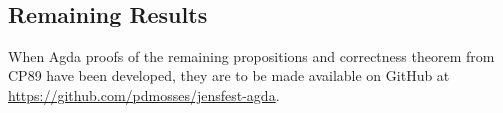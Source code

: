 {\begin{code}
\AgdaSymbol{(}\AgdaSpace{}%
\AgdaSymbol{(}\AgdaSpace{}%
\AgdaSymbol{)}\AgdaSpace{}%
\AgdaSymbol{))}\AgdaSpace{}%
\AgdaSymbol{(}\AgdaSpace{}%
\AgdaSymbol{(}\AgdaSpace{}%
\AgdaSymbol{)}\AgdaSpace{}%
\AgdaSpace{}%
\AgdaSymbol{)}\AgdaSpace{}%
\AgdaSymbol{(}\AgdaSpace{}%
\AgdaSymbol{(}\AgdaSpace{}%
\AgdaSymbol{(}\AgdaSpace{}%
\AgdaSymbol{))}\AgdaSpace{}%
\AgdaSpace{}%
\AgdaSymbol{)}\<%
\\
\>[14][@{}l@{\AgdaIndent{0}}]%
\>[16]\AgdaSymbol{(}\AgdaSpace{}%
\AgdaSymbol{(}\AgdaSpace{}%
\AgdaSymbol{)}\AgdaSpace{}%
\AgdaSpace{}%
\AgdaSymbol{))}\<%
\end{code}
}%
%

\subsection{Remaining Results}

When Agda proofs of the remaining propositions and correctness theorem from CP89
have been developed, they are to be made available on GitHub at
\url{https://github.com/pdmosses/jensfest-agda}.


